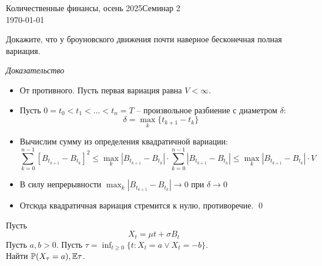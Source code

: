 \documentclass[12pt]{article}
\begin{document}
\noindent Количественные финансы, осень 2025\hfill Семинар 2\\
\today

\hrulefill

\begin{problem}
    Докажите, что у броуновского движения почти наверное бесконечная полная вариация.
\end{problem}

\textit{Доказательство}
\begin{itemize}
    \item От противного. Пусть первая вариация равна $V < \infty$.
    \item Пусть $0 = t_0 < t_1 < \ldots < t_n = T$ -- произвольное разбиение с диаметром $\delta$: 
        $$\delta = \max_k \{t_{k+1} - t_k\}$$ 
    \item Вычислим сумму из определения квадратичной вариации: $$
        \sum_{k=0}^{n-1} \left[B_{t_{k+1}} - B_{t_k}\right]^2 \leq 
        \max_{k} |B_{t_{k+1}} - B_{t_k}| \cdot \sum_{k=0}^{n-1} |B_{t_{k+1}} - B_{t_k}|
        \leq \max_{k} |B_{t_{k+1}} - B_{t_k}| \cdot V
    $$
    \item В силу непрерывности $\max_{k} |B_{t_{k+1}} - B_{t_k}|\to 0$ при $\delta \to 0$
    \item Отсюда квадратичная вариация стремится к нулю, противоречие. \qed
\end{itemize}

\begin{problem}
    Пусть 
    $$
        X_t = \mu t + \sigma B_t
    $$
    Пусть $a, b > 0$. Пусть $\tau = \inf_{t \geq 0} \{t: X_t = a \lor X_t = -b\}$.
    \\ Найти $\mathbb{P}(X_{\tau} = a), \mathbb{E} \tau$.
\end{problem}
\end{document}
